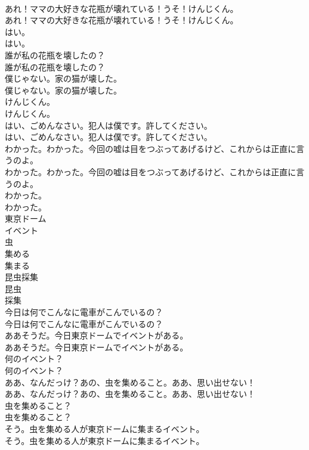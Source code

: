 \documentclass[8pt]{extreport}
\begin{document}
\begin{CJK}{UTF8}{min}
\\	あれ！ママの大好きな花瓶が壊れている！うそ！けんじくん。	
\\	あれ！ママの大好きな花瓶が壊れている！うそ！けんじくん。 
\\	はい。	
\\	はい。 
\\	誰が私の花瓶を壊したの？	
\\	誰が私の花瓶を壊したの？ 
\\	僕じゃない。家の猫が壊した。	
\\	僕じゃない。家の猫が壊した。 
\\	けんじくん。	
\\	けんじくん。 
\\	はい、ごめんなさい。犯人は僕です。許してください。	
\\	はい、ごめんなさい。犯人は僕です。許してください。 
\\	わかった。わかった。今回の嘘は目をつぶってあげるけど、これからは正直に言うのよ。	
\\	わかった。わかった。今回の嘘は目をつぶってあげるけど、これからは正直に言うのよ。 
\\	わかった。	
\\	わかった。 
\\	東京ドーム
\\	イベント
\\	虫
\\	集める
\\	集まる
\\	昆虫採集
\\	昆虫
\\	採集
\\	今日は何でこんなに電車がこんでいるの？	
\\	今日は何でこんなに電車がこんでいるの？ 
\\	ああそうだ。今日東京ドームでイベントがある。	
\\	ああそうだ。今日東京ドームでイベントがある。 
\\	何のイベント？	
\\	何のイベント？ 
\\	ああ、なんだっけ？あの、虫を集めること。ああ、思い出せない！	
\\	ああ、なんだっけ？あの、虫を集めること。ああ、思い出せない！ 
\\	虫を集めること？	
\\	虫を集めること？ 
\\	そう。虫を集める人が東京ドームに集まるイベント。	
\\	そう。虫を集める人が東京ドームに集まるイベント。 

\end{CJK}
\end{document}
